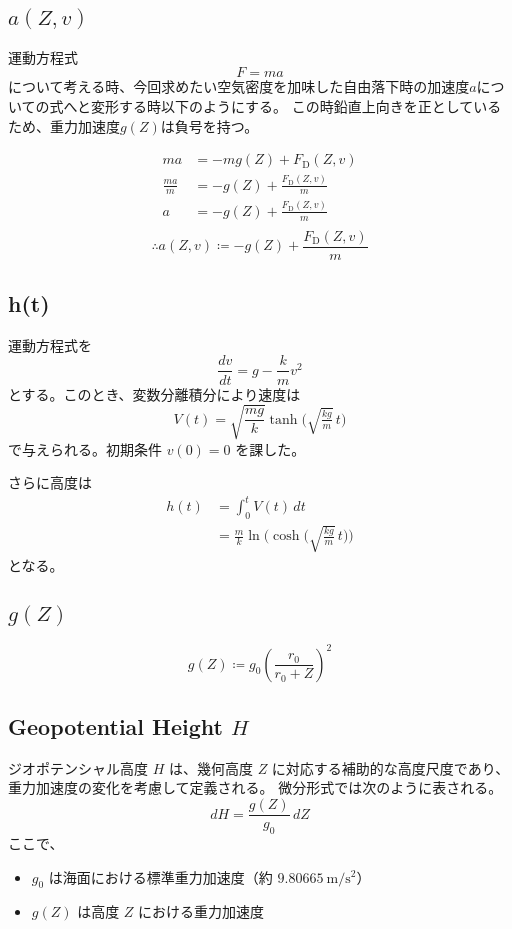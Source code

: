 \documentclass[a4paper,12pt]{article}
\begin{document}
\subsection{\texorpdfstring{$a(Z, v)$}{}}
運動方程式
\[
  F = ma
\]
について考える時、今回求めたい空気密度を加味した自由落下時の加速度$a$についての式へと変形する時以下のようにする。
この時鉛直上向きを正としているため、重力加速度$g(Z)$は負号を持つ。

\begin{align*}
  ma &= -mg(Z) + F_{\mathrm{D}}(Z, v)\\
  \frac{ma}{m} &= -g(Z) + \frac{F_{\mathrm{D}}(Z, v)}{m}\\
  a &= -g(Z) + \frac{F_{\mathrm{D}}(Z, v)}{m}\\
\end{align*}
\[
  \therefore a(Z, v) \coloneq -g(Z) + \frac{F_{\mathrm{D}}(Z, v)}{m}
\]

\subsection{h(t)}
運動方程式を
\[
  \frac{dv}{dt} = g - \frac{k}{m}v^2
\]
とする。このとき、変数分離積分により速度は
\[
V(t) = \sqrt{\frac{mg}{k}} \tanh\!\Big(\sqrt{\tfrac{kg}{m}}\,t\Big)
\]
で与えられる。初期条件 $v(0)=0$ を課した。

さらに高度は
\begin{align*}
  h(t) &= \int_0^t V(t)\,dt\\
&=\frac{m}{k}\ln\!\Big(\cosh\!\Big(\sqrt{\tfrac{kg}{m}}\,t\Big)\Big)
\end{align*}
となる。

\subsection{\texorpdfstring{$g(Z)$}{g(Z)}}

\[
  g(Z) \coloneq g_0\left(\frac{r_0}{r_0+Z}\right)^2
\]

\subsection{\texorpdfstring{Geopotential Height \(H\)}{GPH}}

ジオポテンシャル高度 \(H\) は、幾何高度 \(Z\) に対応する補助的な高度尺度であり、重力加速度の変化を考慮して定義される。  
微分形式では次のように表される。
\[
dH = \frac{g(Z)}{g_0} \, dZ
\]
ここで、
\begin{itemize}
  \item \(g_0\) は海面における標準重力加速度（約 \(9.80665~\mathrm{m/s^2}\)）
  \item \(g(Z)\) は高度 \(Z\) における重力加速度
\end{itemize}
\end{document}
